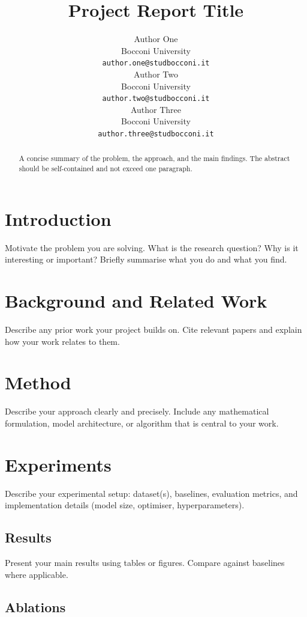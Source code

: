 \documentclass{article}
\title{Project Report Title}
\author{%
  Author One \\
  Bocconi University \\
  \texttt{author.one@studbocconi.it} \\
  \And
  Author Two \\
  Bocconi University \\
  \texttt{author.two@studbocconi.it} \\
  \And
  Author Three \\
  Bocconi University \\
  \texttt{author.three@studbocconi.it} \\
}
\begin{document}
\maketitle

\begin{abstract}
A concise summary of the problem, the approach, and the main findings.
The abstract should be self-contained and not exceed one paragraph.
\end{abstract}

\section{Introduction}

Motivate the problem you are solving.
What is the research question?
Why is it interesting or important?
Briefly summarise what you do and what you find.

\section{Background and Related Work}

Describe any prior work your project builds on.
Cite relevant papers and explain how your work relates to them.

\section{Method}

Describe your approach clearly and precisely.
Include any mathematical formulation, model architecture, or algorithm
that is central to your work.

\section{Experiments}

Describe your experimental setup: dataset(s), baselines, evaluation metrics,
and implementation details (model size, optimiser, hyperparameters).

\subsection{Results}

Present your main results using tables or figures.
Compare against baselines where applicable.

\subsection{Ablations}
\end{document}
